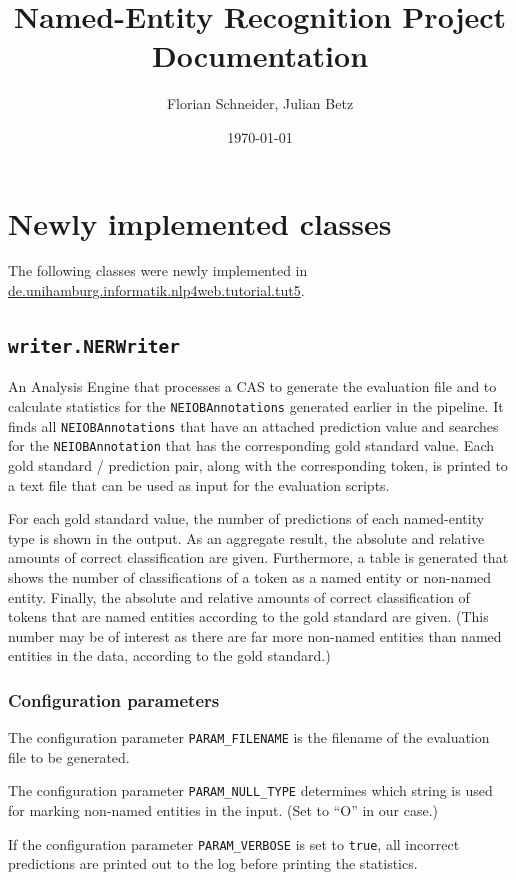 \documentclass[11pt, english]{article}
\title{Named-Entity Recognition Project\\Documentation}
\author{Florian Schneider, Julian Betz}
\date{\today}
\begin{document}
\maketitle

\pagestyle{mainmatter}

\section{Newly implemented classes}
\label{sec:Classes}
The following classes were newly implemented in \url{de.unihamburg.informatik.nlp4web.tutorial.tut5}.

\subsection{\texttt{writer.NERWriter}}
An Analysis Engine that processes a CAS to generate the evaluation file and to calculate statistics for the \verb/NEIOBAnnotations/ generated earlier in the pipeline.
It finds all \verb/NEIOBAnnotations/ that have an attached prediction value and searches for the \verb/NEIOBAnnotation/ that has the corresponding gold standard value.
Each gold standard / prediction pair, along with the corresponding token, is printed to a text file that can be used as input for the evaluation scripts.

For each gold standard value, the number of predictions of each named-entity type is shown in the output.
As an aggregate result, the absolute and relative amounts of correct classification are given.
Furthermore, a table is generated that shows the number of classifications of a token as a named entity or non-named entity.
Finally, the absolute and relative amounts of correct classification of tokens that are named entities according to the gold standard are given.
(This number may be of interest as there are far more non-named entities than named entities in the data, according to the gold standard.)

\subsubsection{Configuration parameters}
The configuration parameter \verb/PARAM_FILENAME/ is the filename of the evaluation file to be generated.

The configuration parameter \verb/PARAM_NULL_TYPE/ determines which string is used for marking non-named entities in the input.
(Set to ``O'' in our case.)

If the configuration parameter \verb/PARAM_VERBOSE/ is set to \verb/true/, all incorrect predictions are printed out to the log before printing the statistics.
\end{document}
